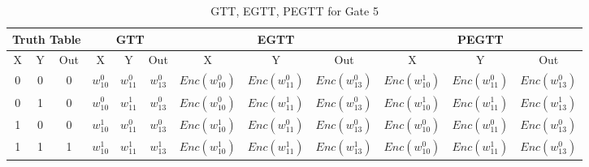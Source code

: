 \documentclass[times]{article}
\begin{document}
	\begin{table}
		\centering
		\caption{GTT, EGTT, PEGTT for Gate 5}
		\label{tab:gtt5}
		\begin{adjustbox}{width=1\textwidth}
		\begin{tabular}{|c|c|c||c|c|c||c|c|c||c|c|c|}
			\hline
			\multicolumn{3}{|c||}{Truth Table} 		& 
				\multicolumn{3}{|c||}{GTT}			& 
					\multicolumn{3}{|c||}{EGTT} 		& 
						\multicolumn{3}{|c|}{PEGTT} \\
			\hline
			\hline
			X & Y & Out	& 
				X & Y & Out	& 
					X & Y & Out	& 
						X & Y & Out	\\
			\hline
			0 & 0 & 0 	&
				$w_{10}^0$	& $w_{11}^0$	& $w_{13}^0$	& 
					$Enc(w_{10}^0)$	& $Enc(w_{11}^0)$	& $Enc(w_{13}^0)$ &
						$Enc(w_{10}^1)$	& $Enc(w_{11}^0)$	& $Enc(w_{13}^0)$ \\
			\hline
			0 & 1 & 0 	&
				$w_{10}^0$	& $w_{11}^1$	& $w_{13}^0$	& 
					$Enc(w_{10}^0)$	& $Enc(w_{11}^1)$	& $Enc(w_{13}^0)$ &
						$Enc(w_{10}^1)$	& $Enc(w_{11}^1)$	& $Enc(w_{13}^1)$ \\
			\hline
			1 & 0 & 0 	&
				$w_{10}^1$	& $w_{11}^0$	& $w_{13}^0$	& 
					$Enc(w_{10}^1)$	& $Enc(w_{11}^0)$	& $Enc(w_{13}^0)$ &
						$Enc(w_{10}^0)$	& $Enc(w_{11}^0)$	& $Enc(w_{13}^0)$ \\
			\hline
			1 & 1 & 1 	&
				$w_{10}^1$	& $w_{11}^1$	& $w_{13}^1$	& 
					$Enc(w_{10}^1)$	& $Enc(w_{11}^1)$	& $Enc(w_{13}^1)$ &
						$Enc(w_{10}^0)$	& $Enc(w_{11}^1)$	& $Enc(w_{13}^0)$ \\
			\hline
		\end{tabular}
		\end{adjustbox}
	\end{table}
\end{document}
